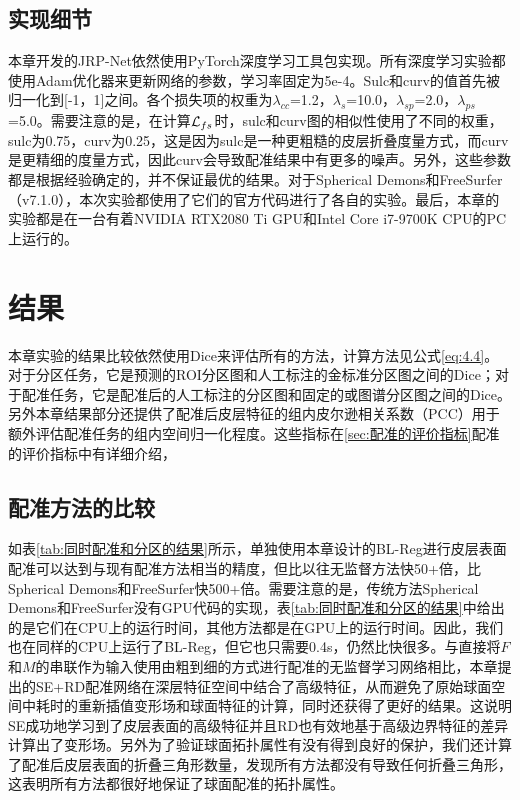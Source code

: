 \subsection{实现细节}
本章开发的JRP-Net依然使用PyTorch深度学习工具包实现。所有深度学习实验都使用Adam优化器\cite{kingma2014adam}来更新网络的参数，学习率固定为5e-4。Sulc和curv的值首先被归一化到[-1，1]之间。各个损失项的权重为$\lambda_{cc}$=1.2，$\lambda_s$=10.0，$\lambda_{sp}$=2.0，$\lambda_{ps}$=5.0。需要注意的是，在计算${\cal L}_{fs}$时，sulc和curv图的相似性使用了不同的权重，sulc为0.75，curv为0.25，这是因为sulc是一种更粗糙的皮层折叠度量方式，而curv是更精细的度量方式，因此curv会导致配准结果中有更多的噪声。另外，这些参数都是根据经验确定的，并不保证最优的结果。对于Spherical Demons和FreeSurfer（v7.1.0），本次实验都使用了它们的官方代码进行了各自的实验。最后，本章的实验都是在一台有着NVIDIA RTX2080 Ti GPU和Intel Core i7-9700K CPU的PC上运行的。


\section{结果}
本章实验的结果比较依然使用Dice来评估所有的方法，计算方法见公式\ref{eq:4.4}。对于分区任务，它是预测的ROI分区图和人工标注的金标准分区图之间的Dice；对于配准任务，它是配准后的人工标注的分区图和固定的或图谱分区图之间的Dice。另外本章结果部分还提供了配准后皮层特征的组内皮尔逊相关系数（PCC）用于额外评估配准任务的组内空间归一化程度。这些指标在\ref{sec:配准的评价指标}配准的评价指标中有详细介绍，

\subsection{配准方法的比较}
如表\ref{tab:同时配准和分区的结果}所示，单独使用本章设计的BL-Reg进行皮层表面配准可以达到与现有配准方法相当的精度，但比以往无监督方法\cite{zhao2020unsupervised}快50+倍，比Spherical Demons和FreeSurfer\cite{yeo2009spherical,fischl1999high}快500+倍。需要注意的是，传统方法Spherical Demons\cite{yeo2009spherical}和FreeSurfer\cite{fischl1999high}没有GPU代码的实现，表\ref{tab:同时配准和分区的结果}中给出的是它们在CPU上的运行时间，其他方法都是在GPU上的运行时间。因此，我们也在同样的CPU上运行了BL-Reg，但它也只需要0.4s，仍然比\cite{yeo2009spherical,fischl1999high}快很多。与直接将$F$和$M$的串联作为输入使用由粗到细的方式进行配准的无监督学习网络\cite{zhao2020unsupervised}相比，本章提出的SE+RD配准网络在深层特征空间中结合了高级特征，从而避免了原始球面空间中耗时的重新插值变形场和球面特征的计算，同时还获得了更好的结果。这说明SE成功地学习到了皮层表面的高级特征并且RD也有效地基于高级边界特征的差异计算出了变形场。另外为了验证球面拓扑属性有没有得到良好的保护，我们还计算了配准后皮层表面的折叠三角形\cite{moller1997fast}数量，发现所有方法都没有导致任何折叠三角形，这表明所有方法都很好地保证了球面配准的拓扑属性。

